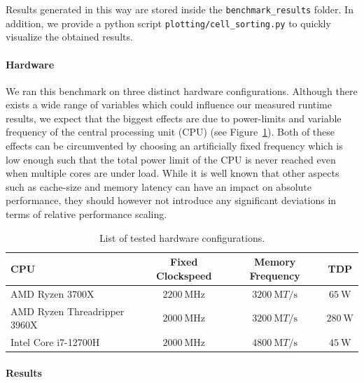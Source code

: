 \documentclass[a4paper]{article}
\begin{document}
Results generated in this way are stored inside the \texttt{benchmark\_results} folder.
In addition, we provide a python script \texttt{plotting/cell\_sorting.py} to quickly visualize
the obtained results.

\paragraph{Hardware}
We ran this benchmark on three distinct hardware configurations.
Although there exists a wide range of variables which could influence our measured runtime results,
we expect that the biggest effects are due to power-limits and variable frequency of the
central processing unit (CPU) (see Figure~\ref{tab:hardware-configurations}).
Both of these effects can be circumvented by choosing an artificially fixed frequency which is low
enough such that the total power limit of the CPU is never reached even when multiple cores are
under load.
While it is well known that other aspects such as cache-size and memory latency can have an impact
on absolute performance, they should however not introduce any significant deviations in terms of
relative performance scaling.

\begin{table}
    \centering
    \begin{tabular}{l c c c}
        CPU & Fixed Clockspeed & Memory Frequency & TDP\\
        \hline
        AMD Ryzen 3700X~\cite{AMDProductSpecifications} & $\SI{2200}{\mega\hertz}$
            & $\SI{3200}{\mega T\per\second}$ & $\SI{65}{\watt}$\\
        AMD Ryzen Threadripper 3960X~\cite{AMDProductSpecifications} & $\SI{2000}{\mega\hertz}$
            & $\SI{3200}{\mega T\per\second}$ & $\SI{280}{\watt}$\\
        Intel Core i7-12700H~\cite{Inteli712700H} & $\SI{2000}{\mega\hertz}$
            & $\SI{4800}{\mega T\per\second}$
            & $\SI{45}{\watt}$\\
    \end{tabular}
    \caption{List of tested hardware configurations.}
    \label{tab:hardware-configurations}
\end{table}

\paragraph{Results}
\end{document}
